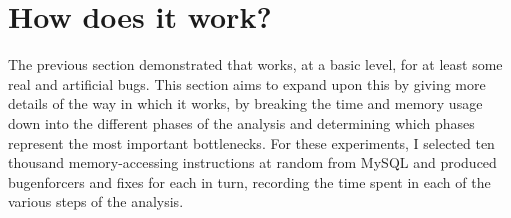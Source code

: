 \section{How does it work?}
\label{sect:eval:how_does_it_work}
\newcommand{\subphase}[2]{$\mathbb{#1}_{#2}$}
\newcommand{\subcrash}[1]{\subphase{C}{#1}}
\newcommand{\subinterfering}[1]{\subphase{I}{#1}}
\newcommand{\subenf}[1]{\subphase{E}{#1}}
\newcommand{\subfix}[1]{\subphase{F}{#1}}

The previous section demonstrated that {\implementation} works, at a basic
level, for at least some real and artificial bugs.  This section aims
to expand upon this by giving more details of the way in which it
works, by breaking the time and memory usage down into the different
phases of the analysis and determining which phases represent the most
important bottlenecks.  For these experiments, I selected ten thousand
memory-accessing instructions at random from MySQL and produced
\glspl{bugenforcer} and fixes for each in turn, recording the time
spent in each of the various steps of the analysis.

